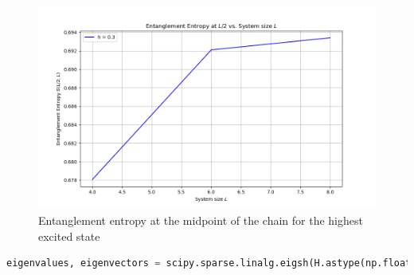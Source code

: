 \documentclass[12pt]{article}
\begin{document}
\begin{figure}
\centering
\includegraphics[width=\textwidth]{entanglement_entropy_L2_LA.png}
\caption{Entanglement entropy at the midpoint of the chain for the highest excited state}
\end{figure}
\begin{lstlisting}[language=Python]
eigenvalues, eigenvectors = scipy.sparse.linalg.eigsh(H.astype(np.float64), k=1, which='LA')
\end{lstlisting}
\newpage
\end{document}

